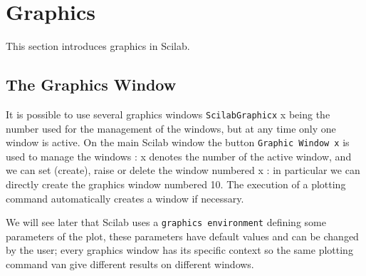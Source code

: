 
\chapter{Graphics}
This section introduces graphics in Scilab. 

\section{The Graphics Window}
It is possible to use several graphics windows {\tt ScilabGraphicx} x being
the number used for the management of the windows, but at any time only
one window is active. On the main Scilab window the button
 {\tt Graphic Window x} is used to manage the windows : x denotes the
number of the active window, and we can set (create), raise or delete 
the window numbered x : in particular we can directly create the 
graphics window numbered 10.
The execution of a plotting command automatically creates a window if 
necessary.

We will see later that Scilab uses a {\tt graphics environment}
defining some parameters of the plot, these parameters have default
values and can be changed by the user; every graphics window has its
specific context so the same plotting command van give different
results on different windows.

